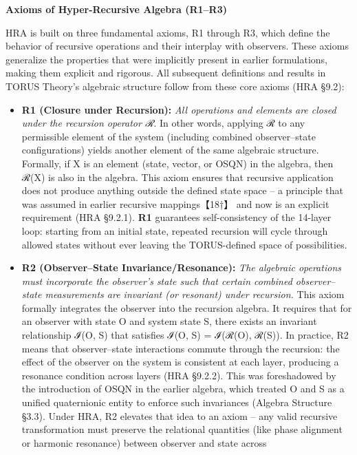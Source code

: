 \documentclass[]{article}
\begin{document}
\textbf{Axioms of Hyper-Recursive Algebra (R1--R3)}

HRA is built on three fundamental axioms, R1 through R3, which define
the behavior of recursive operations and their interplay with observers.
These axioms generalize the properties that were implicitly present in
earlier formulations, making them explicit and rigorous. All subsequent
definitions and results in TORUS Theory's algebraic structure follow
from these core axioms (HRA §9.2):

\begin{itemize}
\item
  \textbf{R1 (Closure under Recursion):} \emph{All operations and
  elements are closed under the recursion operator ℛ.} In other words,
  applying ℛ to any permissible element of the system (including
  combined observer--state configurations) yields another element of the
  same algebraic structure. Formally, if X is an element (state, vector,
  or OSQN) in the algebra, then ℛ(X) is also in the algebra. This axiom
  ensures that recursive application does not produce anything outside
  the defined state space -- a principle that was assumed in earlier
  recursive mappings【18†】 and now is an explicit requirement (HRA
  §9.2.1). \textbf{R1} guarantees self-consistency of the 14-layer loop:
  starting from an initial state, repeated recursion will cycle through
  allowed states without ever leaving the TORUS-defined space of
  possibilities.
\item
  \textbf{R2 (Observer--State Invariance/Resonance):} \emph{The
  algebraic operations must incorporate the observer's state such that
  certain combined observer--state measurements are invariant (or
  resonant) under recursion.} This axiom formally integrates the
  observer into the recursion algebra. It requires that for an observer
  with state O and system state S, there exists an invariant
  relationship ℐ(O, S) that satisfies ℐ(O, S) = ℐ(ℛ(O), ℛ(S)). In
  practice, R2 means that observer--state interactions commute through
  the recursion: the effect of the observer on the system is consistent
  at each layer, producing a resonance condition across layers (HRA
  §9.2.2). This was foreshadowed by the introduction of OSQN in the
  earlier algebra, which treated O and S as a unified quaternionic
  entity to enforce such invariances (Algebra Structure §3.3). Under
  HRA, R2 elevates that idea to an axiom -- any valid recursive
  transformation must preserve the relational quantities (like phase
  alignment or harmonic resonance) between observer and state across

\end{itemize}
\end{document}
